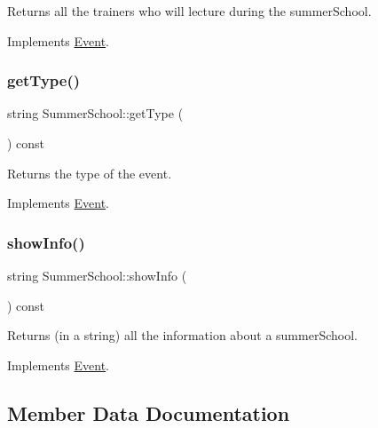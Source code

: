 Returns all the trainers who will lecture during the summer\+School. 



Implements \hyperlink{classEvent_a11aad3e5a7ee85bc61b6811d050c5d70}{Event}.

\mbox{\label{classSummerSchool_a2ba547411ca8f161c2c579f9f55f913e}} 
\subsubsection{\texorpdfstring{get\+Type()}{getType()}}
{\footnotesize\ttfamily string Summer\+School\+::get\+Type (\begin{DoxyParamCaption}{ }\end{DoxyParamCaption}) const\hspace{0.3cm}{\ttfamily [virtual]}}



Returns the type of the event. 



Implements \hyperlink{classEvent_a224dbd9a9aee5937ba0c8ea1a056af1f}{Event}.

\mbox{\label{classSummerSchool_a61ac7307840f787e3de639d431248e26}} 
\subsubsection{\texorpdfstring{show\+Info()}{showInfo()}}
{\footnotesize\ttfamily string Summer\+School\+::show\+Info (\begin{DoxyParamCaption}{ }\end{DoxyParamCaption}) const\hspace{0.3cm}{\ttfamily [virtual]}}



Returns (in a string) all the information about a summer\+School. 



Implements \hyperlink{classEvent_aaa38f467e933c57190d43351bdb817be}{Event}.



\subsection{Member Data Documentation}
\mbox{\label{classSummerSchool_a7e6899945d6a486e9d1d1f581236630b}} 
